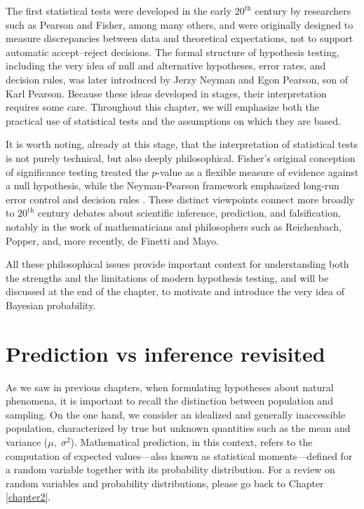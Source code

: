 The first statistical tests were developed in the early $20^{\text{th}}$ century by researchers such as Pearson and Fisher, among many others, and were originally designed to measure discrepancies between data and theoretical expectations, not to support automatic accept--reject decisions. The formal structure of hypothesis testing, including the very idea of null and alternative hypotheses, error rates, and decision rules, was later introduced by Jerzy Neyman and Egon Pearson, son of Karl Pearson. Because these ideas developed in stages, their interpretation requires some care. Throughout this chapter, we will emphasize both the practical use of statistical tests and the assumptions on which they are based.

\medskip

It is worth noting, already at this stage, that the interpretation of statistical tests is not purely technical, but also deeply philosophical. Fisher’s original conception of significance testing treated the \(p\)-value as a flexible measure of evidence against a null hypothesis, while the Neyman-Pearson framework emphasized long-run error control and decision rules \cite{pearson_neyman_1933_efficient}. These distinct viewpoints connect more broadly to $20^{\text{th}}$ century debates about scientific inference, prediction, and falsification, notably in the work of mathematicians and philosophers such as Reichenbach, Popper, and, more recently, de Finetti and Mayo.

All these philosophical issues provide important context for understanding both the strengths and the limitations of modern hypothesis testing, and will be discussed at the end of the chapter, to motivate and introduce the very idea of Bayesian probability.

\section{Prediction vs inference revisited}

As we saw in previous chapters, when formulating hypotheses about natural phenomena, it is important to recall the distinction between population and sampling. On the one hand, we consider an idealized and generally inaccessible population, characterized by true but unknown quantities such as the mean and variance (\(\mu, \; \sigma^2\)). Mathematical prediction, in this context, refers to the computation of expected values—also known as statistical moments—defined for a random variable together with its probability distribution. For a review on random variables and probability distributions, please go back to Chapter \ref{chapter2}.

